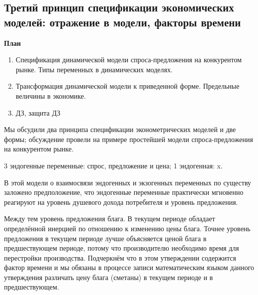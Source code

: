 \documentclass[12pt,a4paper]{article}
\author{Аверьянов Т.С.}
\begin{document}
\begin{center}
\section*{Третий принцип спецификации экономических моделей: отражение в модели, факторы времени}
\end{center}
\begin{center}
\textbf{План}
\end{center}
\begin{enumerate}
\item Спецификация динамической модели спроса-предложения на конкурентом рынке. Типы переменных в динамических моделях.
\item Трансформация динамической модели к приведенной форме. Предельные величины в экономике. 
\item ДЗ, защита ДЗ
\end{enumerate}

Мы обсудили два принципа спецификации эконометрических моделей и две формы; обсуждение провели на примере простейшей модели спроса-предложения на конкурентом рынке.

3 эндогенные переменные: спрос, предложение и цена; 1 эндогенная: x.

В этой модели о взаимосвязи эндогенных  и экзогенных переменных по существу заложено предположение, что эндогенные переменные практически мгновенно реагируют на уровень душевого дохода потребителя и уровень предложения.

Между тем уровень предложения блага. В текущем периоде обладает определённой инерцией по отношению к изменению цены блага. Точнее уровень предложения в текущем периоде лучше объясняется ценой блага в предшествующем периоде, потому что производителю необходимо время для перестройки производства. Подчеркнём что в этом утверждении содержится фактор времени и мы обязаны в процессе записи математическим языком данного утверждения различать цену блага (сметаны) в текущем периоде и в предшествующем.
\end{document}
